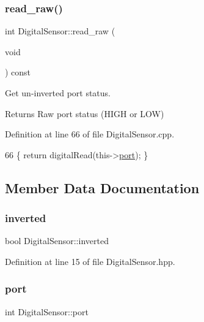 \subsubsection{\texorpdfstring{read\+\_\+raw()}{read\_raw()}}
{\footnotesize\ttfamily int Digital\+Sensor\+::read\+\_\+raw (\begin{DoxyParamCaption}\item[{void}]{ }\end{DoxyParamCaption}) const}



Get un-\/inverted port status. 

\begin{DoxyReturn}{Returns}
Raw port status (H\+I\+GH or L\+OW) 
\end{DoxyReturn}


Definition at line 66 of file Digital\+Sensor.\+cpp.


\begin{DoxyCode}
66 \{ \textcolor{keywordflow}{return} digitalRead(this->\hyperlink{class_digital_sensor_a5d6d5b9d33670b7f2d8b745b175ce023}{port}); \}
\end{DoxyCode}


\subsection{Member Data Documentation}
\mbox{\label{class_digital_sensor_a0458d9c3e2f781a776742a080d7b7e81}} 
\subsubsection{\texorpdfstring{inverted}{inverted}}
{\footnotesize\ttfamily bool Digital\+Sensor\+::inverted\hspace{0.3cm}{\ttfamily [private]}}



Definition at line 15 of file Digital\+Sensor.\+hpp.

\mbox{\label{class_digital_sensor_a5d6d5b9d33670b7f2d8b745b175ce023}} 
\subsubsection{\texorpdfstring{port}{port}}
{\footnotesize\ttfamily int Digital\+Sensor\+::port\hspace{0.3cm}{\ttfamily [private]}}



